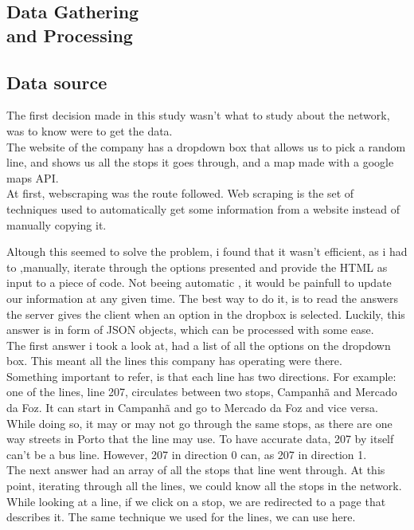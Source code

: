\documentclass[12pt]{article}
\begin{document}
\begin{multicols}{2}
\section{Data Gathering \\ and Processing}

\subsection{Data source}
The first decision made in this study wasn't what to study about the network, was to know were to get the data. \\
	The website of the company has a dropdown box that allows us to pick a random line, and shows us all the stops it goes through, and a map made with a google maps API.\\
At first, webscraping was the route followed. Web scraping \cite{vargiu2012exploiting} is  the set of techniques used to automatically get some information from a website instead of manually copying it.

 Altough this seemed to solve the problem, i found that it wasn't efficient, as i had to ,manually, iterate through the options presented and provide the HTML as input to a piece of code. Not beeing automatic , it would be painfull to update our information at any given time.
The best way to do it, is to read the answers the server gives the client when an option in the dropbox is selected. Luckily, this answer is in form of JSON objects, which can be processed with some ease.\\
The first answer i took a look at, had a list of all the options on the dropdown box. This meant all the lines this company has operating were there.\\
Something important to refer, is that each line has two directions. For example: one of the lines, line 207, circulates between two stops, Campanhã and Mercado da Foz. It can start in Campanhã and go to Mercado da Foz and vice versa. While doing so, it may or may not go through the same stops, as there are one way streets in Porto that the line may use. To have accurate data, 207 by itself can't be a bus line. However, 207 in direction 0 can, as 207 in direction 1.\\
The next answer had an array of all the stops that line went through. At this point, iterating through all the lines, we could know all the stops in the network.\\
While looking at a line, if we click on a stop, we are redirected to a page that describes it. The same technique we used for the lines, we can use here. \\


\end{multicols}
\end{document}
